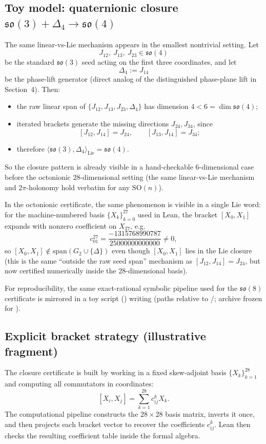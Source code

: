\documentclass[11pt]{amsart}
\newcommand{\PaperArtifactBundleZip}{\ReleaseDistArchive}
\newcommand{\PaperArtifactBundleDir}{\PaperReproBundleDir}
\begin{document}
\subsection*{Toy model: quaternionic closure \texorpdfstring{$\mathfrak{so}(3)+\Delta_4\to\mathfrak{so}(4)$}{so(3)+Delta4 to so(4)}}
The same linear-vs-Lie mechanism appears in the smallest nontrivial setting. Let
\[
J_{12},\ J_{13},\ J_{23}\in\mathfrak{so}(4)
\]
be the standard \(\mathfrak{so}(3)\) seed acting on the first three coordinates, and let
\[
\Delta_4:=J_{14}
\]
be the phase-lift generator (direct analog of the distinguished phase-plane lift in Section~4). Then:
\begin{itemize}
  \item the raw linear span of \(\{J_{12},J_{13},J_{23},\Delta_4\}\) has dimension \(4<6=\dim\mathfrak{so}(4)\);
  \item iterated brackets generate the missing directions \(J_{24},J_{34}\), since
  \[
  [J_{12},J_{14}]=J_{24},\qquad [J_{13},J_{14}]=J_{34};
  \]
  \item therefore \(\langle \mathfrak{so}(3),\Delta_4\rangle_{\mathrm{Lie}}=\mathfrak{so}(4)\).
\end{itemize}
So the closure pattern is already visible in a hand-checkable \(6\)-dimensional case before the octonionic \(28\)-dimensional setting (the same linear-vs-Lie mechanism and \(2\pi\)-holonomy hold verbatim for any \(\mathrm{SO}(n)\)).

In the octonionic certificate, the same phenomenon is visible in a single Lie word: for the machine-numbered basis \(\{X_k\}_{k=0}^{27}\) used in Lean, the bracket \([X_0,X_1]\) expands with nonzero coefficient on \(X_{27}\), e.g.
\[
c_{01}^{27}=\frac{-1315768990787}{25000000000000}\neq 0,
\]
so \([X_0,X_1]\notin \mathrm{span}(G_2\cup\{\Delta\})\) even though \([X_0,X_1]\) lies in the Lie closure (this is the same ``outside the raw seed span'' mechanism as \([J_{12},J_{14}]=J_{24}\), but now certified numerically inside the \(28\)-dimensional basis).

For reproducibility, the same exact-rational symbolic pipeline used for the \(\mathfrak{so}(8)\) certificate is mirrored in a toy script () writing  (paths relative to \PaperArtifactBundleDir/; archive \PaperArtifactBundleZip{} frozen for ).

\subsection*{Explicit bracket strategy (illustrative fragment)}
The closure certificate is built by working in a fixed skew-adjoint basis
$\{X_k\}_{k=1}^{28}$ and computing all commutators in coordinates:
\[
[X_i,X_j]=\sum_{k=1}^{28} c_{ij}^k X_k.
\]
The computational pipeline constructs the $28\times 28$ basis matrix, inverts it once, and then projects each bracket vector to recover the coefficients $c_{ij}^k$. Lean then checks the resulting coefficient table inside the formal algebra.
\end{document}

